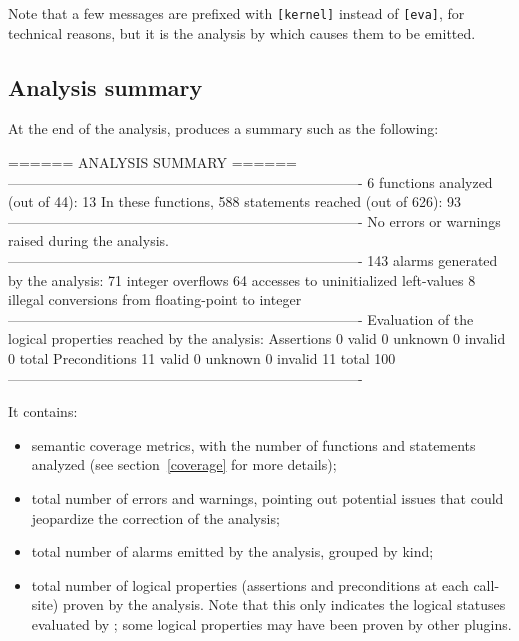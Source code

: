 \documentclass{frama-c-book}
\begin{document}
Note that a few messages are prefixed with \verb|[kernel]| instead of
\verb|[eva]|, for technical reasons, but it is the analysis by \Eva{}
which causes them to be emitted.

\subsection{Analysis summary}

At the end of the analysis, \Eva{} produces a summary such as the
following:

\begin{logsmath}
 ====== ANALYSIS SUMMARY ======
  ----------------------------------------------------------------------------
  6 functions analyzed (out of 44): 13%
  In these functions, 588 statements reached (out of 626): 93%
  ----------------------------------------------------------------------------
  No errors or warnings raised during the analysis.
  ----------------------------------------------------------------------------
  143 alarms generated by the analysis:
      71 integer overflows
      64 accesses to uninitialized left-values
       8 illegal conversions from floating-point to integer
  ----------------------------------------------------------------------------
  Evaluation of the logical properties reached by the analysis:
    Assertions        0 valid     0 unknown     0 invalid      0 total
    Preconditions    11 valid     0 unknown     0 invalid     11 total
  100%
  ----------------------------------------------------------------------------
\end{logsmath}

It contains:

\begin{itemize}
\item semantic coverage metrics, with the number of functions and
  statements analyzed (see section \ref{coverage} for more details);
\item total number of errors and warnings, pointing out potential issues that
  could jeopardize the correction of the analysis;
\item total number of alarms emitted by the analysis, grouped by kind;
\item total number of logical properties (assertions and preconditions at each call-site)
  proven by the analysis.
  Note that this only indicates the logical statuses evaluated by \Eva{};
  some logical properties may have been proven by other plugins.
\end{itemize}
\end{document}
